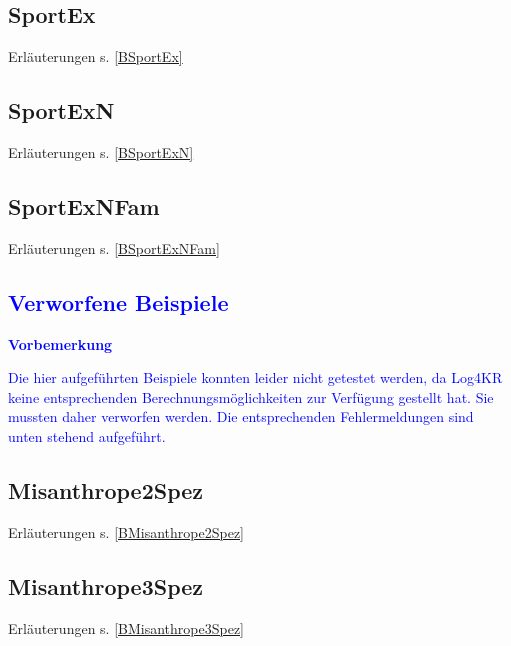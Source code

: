 \documentclass[a4paper, 11pt]{book}
\begin{document}
\section{SportEx} Erläuterungen s. \ref{BSportEx}
\label{SportEx}

\newpage


\section{SportExN} Erläuterungen s. \ref{BSportExN}
\label{SportExN}



\newpage

\section{SportExNFam} Erläuterungen s. \ref{BSportExNFam}
\label{SportExNFam}



\newpage


\textcolor{blue}{
\chapter{Verworfene Beispiele}
\label{examplesdep}
\textbf{Vorbemerkung}
}
\textcolor{blue}{
\noindent
Die hier aufgeführten Beispiele konnten leider nicht getestet werden, da Log4KR keine entsprechenden Berechnungsmöglichkeiten zur Verfügung gestellt hat. Sie mussten daher verworfen werden. Die entsprechenden Fehlermeldungen sind unten stehend aufgeführt.
}
\section{Misanthrope2Spez} Erläuterungen s. \ref{BMisanthrope2Spez}
\label{Misanthrope2Spez}


\newpage


\section{Misanthrope3Spez} Erläuterungen s. \ref{BMisanthrope3Spez}
\label{Misanthrope3Spez}




\lhead{}





\end{document}
